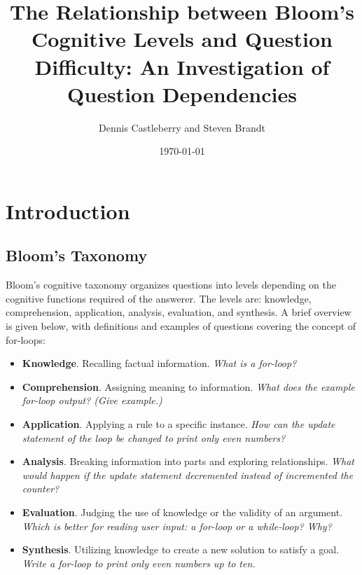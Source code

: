 \documentclass[a4paper,twocolumn]{article}
\title{
 The Relationship between Bloom's Cognitive Levels and Question Difficulty:
   An Investigation of Question Dependencies
}
\author{Dennis Castleberry and Steven Brandt}
\date{\today}
\begin{document}
\maketitle
\thispagestyle{empty}
\pagebreak



\section{Introduction}

\subsection{Bloom's Taxonomy}

Bloom's cognitive taxonomy organizes questions into levels depending on the
cognitive functions required of the answerer.  The levels are: knowledge,
comprehension, application, analysis, evaluation, and synthesis.  A brief
overview is given below, with definitions and examples of questions covering
the concept of for-loops:

\begin{itemize}

\item \textbf{Knowledge}. Recalling factual information.  \emph{What is a
for-loop?}

\item \textbf{Comprehension}. Assigning meaning to information.  \emph{What
does the example for-loop output? (Give example.)}

\item \textbf{Application}. Applying a rule to a specific instance.  \emph{How
can the update statement of the loop be changed to print only even numbers?}

\item \textbf{Analysis}. Breaking information into parts and exploring
relationships.  \emph{What would happen if the update statement decremented
instead of incremented the counter?}

\item \textbf{Evaluation}. Judging the use of knowledge or the validity of an
argument.  \emph{Which is better for reading user input: a for-loop or a
while-loop? Why?}

\item \textbf{Synthesis}. Utilizing knowledge to create a new solution to
satisfy a goal.  \emph{Write a for-loop to print only even numbers up to ten.}

\end{itemize}
\end{document}
